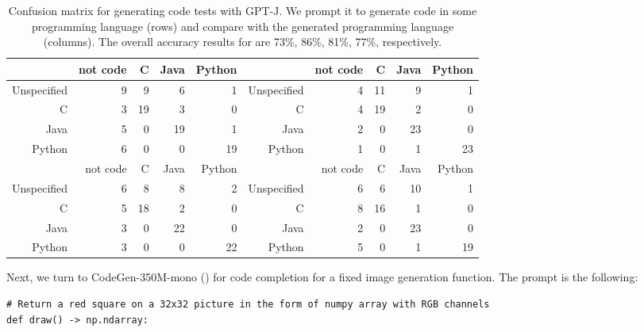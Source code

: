 \documentclass{article}
\begin{document}
\begin{table}
  \centering
  \begin{tabular}{rrrrr|rrrrr}
    \toprule
      & not code & C & Java & Python &  & not code &  C  & Java & Python \\
     \midrule
Unspecified    &        9 &     9 &    6 &      1 & Unspecified    &        4 &    11 &    9 &      1 \\
C    &        3 &    19 &    3 &      0 & C    &        4 &    19 &    2 &      0 \\
Java &        5 &     0 &   19 &      1 & Java &        2 &     0 &   23 &      0 \\
Python   &        6 &     0 &    0 &     19 & Python   &        1 &     0 &    1 &     23 \\
    \toprule
    & not code & C & Java & Python &  & not code &  C  & Java & Python \\
    \midrule
Unspecified & 6 &     8 &    8 &      2 & Unspecified    &        6 &     6 &   10 &      1 \\
C    &        5 &    18 &    2 &      0 & C    &        8 &    16 &    1 &      0 \\
Java &        3 &     0 &   22 &      0 & Java &        2 &     0 &   23 &      0 \\
Python   &        3 &     0 &    0 &     22 & Python   &        5 &     0 &    1 &     19 \\
     
    \bottomrule
  \end{tabular}
  \caption{Confusion matrix for generating code tests with GPT-J. We prompt it to generate code in some programming language (rows) and compare with the generated programming language (columns). The overall accuracy results for  are 73\%, 86\%, 81\%, 77\%, respectively. }
  \label{table:code-cm}
\end{table}

Next, we turn to CodeGen-350M-mono (\cite{nijkamp2023codegen}) for code completion for a fixed image generation function. The prompt is the following:
\begin{lstlisting}
# Return a red square on a 32x32 picture in the form of numpy array with RGB channels
def draw() -> np.ndarray:
\end{lstlisting}
\end{document}
